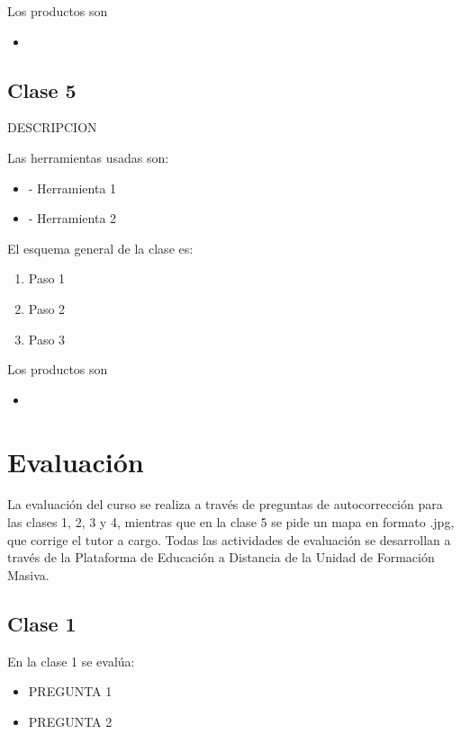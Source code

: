 \documentclass[12pt]{report}
\begin{document}
Los productos son 

\begin{itemize}
    \item {}
\end{itemize}

\section{Clase 5}

DESCRIPCION

Las herramientas usadas son:

\begin{itemize}
    \item {} - Herramienta 1
    \item {} - Herramienta 2
\end{itemize}

El esquema general de la clase es:

\begin{enumerate}
    \item Paso 1
    \item Paso 2
    \item Paso 3
\end{enumerate}

Los productos son 

\begin{itemize}
    \item {}
\end{itemize}


\chapter{Evaluación}\label{evaluacion}

La evaluación del curso se realiza a través de preguntas de autocorrección para las clases 1, 2, 3 y 4, mientras que en la clase 5 se pide un mapa en formato .jpg, que corrige el tutor a cargo. Todas las actividades de evaluación se desarrollan a través de la Plataforma de Educación a Distancia de la Unidad de Formación Masiva.

\section{Clase 1}

En la clase 1 se evalúa:

\begin{itemize}
    \item PREGUNTA 1
    \item PREGUNTA 2
\end{itemize}
\end{document}
